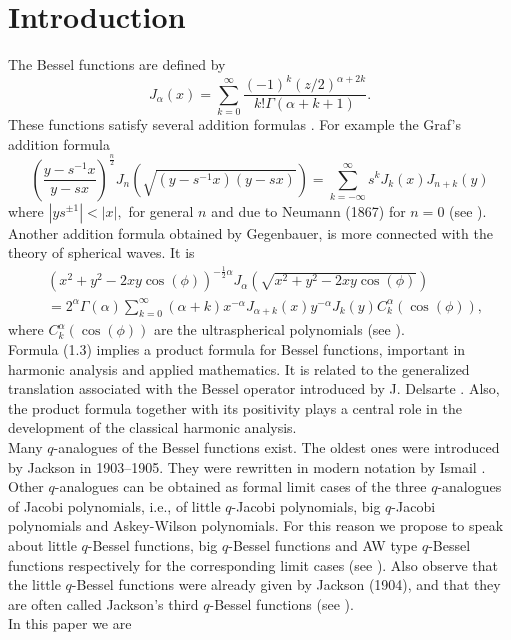 \documentclass[12pt,a4paper]{amsart}
\numberwithin{equation}{section}
\theoremstyle{plain}
\theoremstyle{definition}
\theoremstyle{remark}
\numberwithin{equation}{section}
\numberwithin{table}{section}
\numberwithin{figure}{section}
\begin{document}
\section{Introduction}
The Bessel functions are defined by \cite{Wa}
\begin{equation}
J_{\alpha}(x)= \sum_{k=0}^{\infty}\frac{(-1)^k(z/2
)^{\alpha+2k}}{k!\Gamma(\alpha+k+1)}\label{1}.
 \end{equation}
These functions satisfy several addition formulas \cite{Wa, Vi, Erdely}. For example the Graf's addition formula
\begin{equation}
(\frac{y-s^{-1}x}{y-sx})^{\frac{n}{2}}J_{n}(\sqrt{(y-s^{-1}x)(y-sx)})=\sum_{k=-\infty}^{\infty}s^k
J_k(x)J_{n+k}(y)
\end{equation}
where $|ys^{\pm 1}|<|x|,$ for general $n$ and due to Neumann (1867) for $n=0$ (see \cite{Wa}).\\
Another addition formula obtained by Gegenbauer, is more connected
with the theory of spherical waves. It is
\begin{align}
&(x^2+y^2-2xy \cos(\phi))^{-\frac{1}{2}\alpha}J_{\alpha}(\sqrt{x^2+y^2-2xy \cos(\phi)})
\\&=2^{\alpha}\Gamma(\alpha)\sum_{k=0}^{\infty}(\alpha+k)x^{-\alpha}\nonumber
J_{\alpha+k}(x)y^{-\alpha}J_k(y)C_k^{\alpha}(\cos(\phi)),\label{222}
\end{align}
where $C_k^{\alpha}(\cos(\phi))$ are the ultraspherical polynomials
(see \cite{Sheme}).\\Formula (1.3) implies a product formula for Bessel functions, important in harmonic analysis and applied mathematics. It is related to the
generalized translation associated with the Bessel operator
introduced by J. Delsarte \cite{Delsarte}. Also, the product formula together
with its positivity plays a central role in the development of the
classical harmonic analysis.\\
Many $q$-analogues of the Bessel
functions exist. The oldest ones were introduced by Jackson
in 1903--1905. They were rewritten in modern notation by Ismail \cite{Ism}.
Other $q$-analogues can be obtained as formal limit cases of the
three $q$-analogues of Jacobi polynomials, i.e., of little $q$-Jacobi
polynomials, big $q$-Jacobi polynomials and Askey-Wilson
polynomials. For this reason we propose to speak about little
$q$-Bessel functions, big $q$-Bessel functions and AW type $q$-Bessel
functions respectively for the corresponding limit cases (see \cite{Askey-koelink}). Also observe that the little $q$-Bessel functions were already given by Jackson (1904), and that they are often called Jackson's third $q$-Bessel functions (see \cite{Ismail-Masson}). \\In this paper we are
\end{document}
